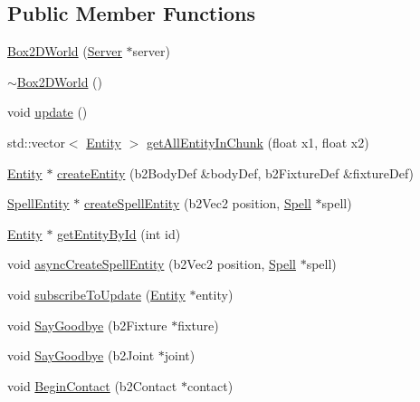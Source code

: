 \subsection*{Public Member Functions}
\begin{DoxyCompactItemize}
\item 
\hyperlink{class_box2_d_world_a1afb954136708078d76c5a1282cded85}{Box2\-D\-World} (\hyperlink{class_server}{Server} $\ast$server)
\item 
\hyperlink{class_box2_d_world_afde1226d1128ca4b16bbffe7bf79b0b0}{$\sim$\-Box2\-D\-World} ()
\item 
void \hyperlink{class_box2_d_world_a2f8ab17447c51b4343f07ac403cc9454}{update} ()
\item 
std\-::vector$<$ \hyperlink{class_entity}{Entity} $>$ \hyperlink{class_box2_d_world_ae1d2d9777c5a7b87253d3396b9f64451}{get\-All\-Entity\-In\-Chunk} (float x1, float x2)
\item 
\hyperlink{class_entity}{Entity} $\ast$ \hyperlink{class_box2_d_world_a13348d9a46d2f0a566d6ea653a5d4598}{create\-Entity} (b2\-Body\-Def \&body\-Def, b2\-Fixture\-Def \&fixture\-Def)
\item 
\hyperlink{class_spell_entity}{Spell\-Entity} $\ast$ \hyperlink{class_box2_d_world_a135cc7599bfc2a3978428fbb155cfcdc}{create\-Spell\-Entity} (b2\-Vec2 position, \hyperlink{class_spell}{Spell} $\ast$spell)
\item 
\hyperlink{class_entity}{Entity} $\ast$ \hyperlink{class_box2_d_world_ad44088e2139e8b6a48437b83de0d545e}{get\-Entity\-By\-Id} (int id)
\item 
void \hyperlink{class_box2_d_world_a4c330d0ac42a183c2bd2dbd8e4bffe9f}{async\-Create\-Spell\-Entity} (b2\-Vec2 position, \hyperlink{class_spell}{Spell} $\ast$spell)
\item 
void \hyperlink{class_box2_d_world_aed35f7a519c5844bf66464bb8aee30ce}{subscribe\-To\-Update} (\hyperlink{class_entity}{Entity} $\ast$entity)
\item 
void \hyperlink{class_box2_d_world_af99542cb5c6eda96dfdec279f73c5e8b}{Say\-Goodbye} (b2\-Fixture $\ast$fixture)
\item 
void \hyperlink{class_box2_d_world_a268ef72c46673588a071d99afd745c98}{Say\-Goodbye} (b2\-Joint $\ast$joint)
\item 
void \hyperlink{class_box2_d_world_a5cceaada591649875632c6bfbca8041f}{Begin\-Contact} (b2\-Contact $\ast$contact)
\end{DoxyCompactItemize}


